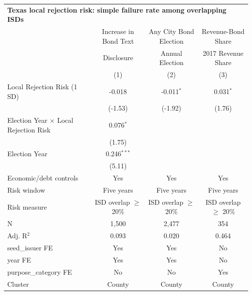 \begingroup
\centering
\begin{tabular*}{\textwidth}{@{\extracolsep{\fill}}lccc}
\multicolumn{4}{l}{\textbf{Texas local rejection risk: simple failure rate among overlapping ISDs}}\\

\addlinespace
   \toprule
                                                & Increase in Bond Text     & Any City Bond Election    & Revenue-Bond Share\\
                                                & Disclosure                & Annual Election           & 2017 Revenue Share \\
                                                & (1)                       & (2)                       & (3)\\
   \midrule
   Local Rejection Risk (1 SD)                  & -0.018                    & -0.011$^{*}$              & 0.031$^{*}$\\
                                                & (-1.53)                  & (-1.92)                  & (1.76)\\
   Election Year $\times$ Local Rejection Risk  & 0.076$^{*}$               &                           &   \\
                                                & (1.75)                   &                           &   \\
   Election Year                                & 0.246$^{***}$             &                           &   \\
                                                & (5.11)                   &                           &   \\
   Economic/debt controls                       & Yes                       & Yes                       & Yes\\
   Risk window                                  & Five years                & Five years                & Five years\\
   Risk measure                                 & ISD overlap $\geq$ 20\%   & ISD overlap $\geq$ 20\%   & ISD overlap $\geq$ 20\%\\
   \hline
   N                                 & 1,500                     & 2,477                     & 354\\
   Adj. R$^2$                               & 0.093                     & 0.020                     & 0.464\\
   seed\_issuer FE                              & Yes                       & Yes                       & No\\
   year FE                                      & Yes                       & Yes                       & No\\
   purpose\_category FE                         & No                        & No                        & Yes\\
   Cluster              & County & County & County\\
   \bottomrule
\end{tabular*}
\par\endgroup
